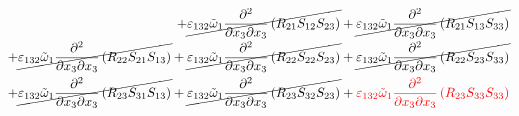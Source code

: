 \begin{equation}
\begin{split}
		+\cancel{\varepsilon_{132}\tilde{\omega}_{1}\pdv{}{x_{3}}{x_{3}}\left(R_{21}S_{12}S_{23}\right)}
		+\cancel{\varepsilon_{132}\tilde{\omega}_{1}\pdv{}{x_{3}}{x_{3}}\left(R_{21}S_{13}S_{33}\right)}\\
		+\cancel{\varepsilon_{132}\tilde{\omega}_{1}\pdv{}{x_{3}}{x_{3}}\left(R_{22}S_{21}S_{13}\right)}
		+\cancel{\varepsilon_{132}\tilde{\omega}_{1}\pdv{}{x_{3}}{x_{3}}\left(R_{22}S_{22}S_{23}\right)}
		+\cancel{\varepsilon_{132}\tilde{\omega}_{1}\pdv{}{x_{3}}{x_{3}}\left(R_{22}S_{23}S_{33}\right)}\\
		+\cancel{\varepsilon_{132}\tilde{\omega}_{1}\pdv{}{x_{3}}{x_{3}}\left(R_{23}S_{31}S_{13}\right)}
		+\cancel{\varepsilon_{132}\tilde{\omega}_{1}\pdv{}{x_{3}}{x_{3}}\left(R_{23}S_{32}S_{23}\right)}
		+{\color{red}\varepsilon_{132}\tilde{\omega}_{1}\pdv{}{x_{3}}{x_{3}}\left(R_{23}S_{33}S_{33}\right)}\\
	\end{split}
\end{equation}

